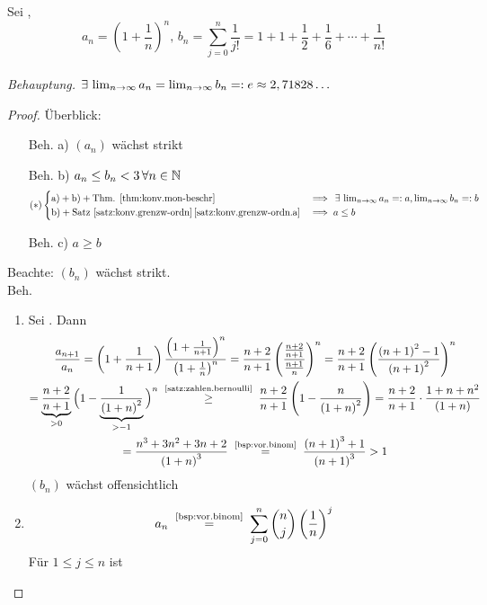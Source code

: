 \documentclass[12pt]{scrreprt}
\begin{document}
\begin{bsp}
\label{bsp:konv.e}
Sei , \[a_n = \left(1+\frac1n\right)^n \text{, } b_n=\sum_{j=0}^{n}{\frac{1}{j!}} = 1+1+\frac12+\frac16+\dotsb+\frac{1}{n!}\]\\
\emph{Behauptung.} $\exists\,\lim_{n\rightarrow\infty}{a_n}=\lim_{n\rightarrow\infty}{b_n}=:e\approx2,71828\dotsc$
\begin{proof}
Überblick:
\begin{enumerate}
\item[Beh. a)] $(a_n)$ wächst strikt
\item[Beh. b)] $a_n \le b_n < 3 \,\forall n\in\mathbb{N}$
\begin{equation*} \label{eqn:konv.e.stern}
(*) \begin{cases} \text{a)}+\text{b)}+\text{Thm. \ref{thm:konv.mon-beschr}} &\implies \,\exists\,\lim_{n\rightarrow\infty}{a_n}=:a, \lim_{n\rightarrow\infty}{b_n}=:b \\ \text{b)}+\text{Satz \ref{satz:konv.grenzw-ordn}\,\ref{satz:konv.grenzw-ordn.a}} &\implies a \le b  \end{cases}
\end{equation*}
\item[Beh. c)] $a \ge b$
\end{enumerate}
Beachte: $(b_n)$ wächst strikt.\\\folgt Beh.
\begin{enumerate}
\item Sei . Dann
\begin{gather*}
\frac{a_{n+1}}{a_n} = \left(1+\frac{1}{n+1}\right) \frac{\left(1+\frac{1}{n+1}\right)^n}{\left(1+\frac1n\right)^n} = \frac{n+2}{n+1} \left( \frac{\frac{n+2}{n+1}}{\frac{n+1}{n}} \right)^n = \frac{n+2}{n+1} \left( \frac{\left(n+1\right)^2-1}{\left(n+1\right)^2} \right)^n \\= \underbrace{\frac{n+2}{n+1}}_{>0} \Big(1-\underbrace{\frac{1}{\left(1+n\right)^2}}_{>-1} \Big)^n \nach{\ge}{\ref{satz:zahlen.bernoulli}} \frac{n+2}{n+1} \left(1-\frac{n}{\left(1+n\right)^2} \right) = \frac{n+2}{n+1} \cdot \frac{1+n+n^2}{\left(1+n\right)} \\= \frac{n^3+3n^2+3n+2}{\left(1+n\right)^3} \nach{=}{\ref{bsp:vor.binom}} \frac{\left(n+1\right)^3+1}{\left(n+1\right)^3} > 1
\end{gather*}
$(b_n)$ wächst offensichtlich
\item \[a_n \nach{=}{\ref{bsp:vor.binom}} \sum_{j=0}^{n}\binom{n}{j}\left(\frac1n\right)^j\]
Für $1\le j \le n$ ist
\begin{equation} \label{eqn:konv.e.plus}

\end{equation}
\end{enumerate}
\end{proof}
\end{bsp}
\end{document}
